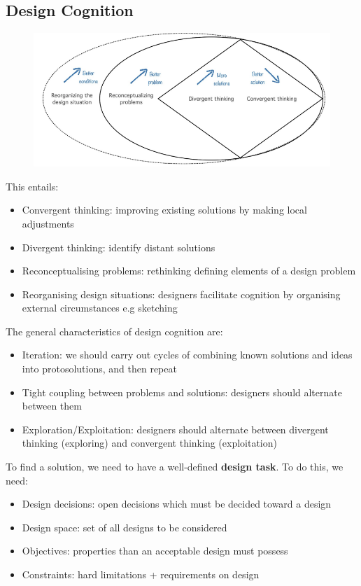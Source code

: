 \documentclass{article}
\begin{document}
\subsection{Design Cognition}
\begin{figure}[H]
    \centering
    \includegraphics[width=0.8\linewidth]{Pictures/Screenshot 2023-03-08 at 12.24.50.png}
\end{figure}
This entails:
\begin{itemize}
    \item Convergent thinking: improving existing solutions by making local adjustments
    \item Divergent thinking: identify distant solutions
    \item Reconceptualising problems: rethinking defining elements of a design problem
    \item Reorganising design situations: designers facilitate cognition by organising external circumstances e.g sketching
\end{itemize}
The general characteristics of design cognition are:
\begin{itemize}
    \item Iteration: we should carry out cycles of combining known solutions and ideas into protosolutions, and then repeat
    \item Tight coupling between problems and solutions: designers should alternate between them
    \item Exploration/Exploitation: designers should alternate between divergent thinking (exploring) and convergent thinking (exploitation)
\end{itemize}
To find a solution, we need to have a well-defined \textbf{design task}. To do this, we need:
\begin{itemize}
    \item Design decisions: open decisions which must be decided toward a design
    \item Design space: set of all designs to be considered
    \item Objectives: properties than an acceptable design must possess
    \item Constraints: hard limitations + requirements on design
\end{itemize}
\end{document}
